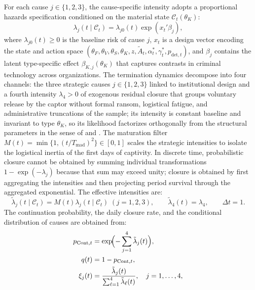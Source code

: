 \documentclass[review,authoryear,12pt]{elsarticle}
\theoremstyle{plain}
\theoremstyle{definition}
\newcommand{\1}{\mathbf{1}}
\begin{document}
For each cause $j\in\{1,2,3\}$, the cause-specific intensity adopts a proportional hazards specification conditioned on the material state $\mathcal{C}_t(\theta_K)$:
\begin{equation}
\lambda_j(t\mid\mathcal{C}_t)=\lambda_{j0}(t)\exp(x_t'\beta_j),
\label{eq:lambda-j}
\end{equation}
where $\lambda_{j0}(t)\ge 0$ is the baseline risk of cause $j$, $x_t$ is a design vector encoding the state and action space $(\theta_F,\theta_V,\theta_S,\theta_K,z,\tilde{A}_t,\alpha_t^\ast,\gamma_t^\ast,p_{\mathrm{det},t})$, and $\beta_j$ contains the latent type-specific effect $\beta_{K,j}(\theta_K)$ that captures contrasts in criminal technology across organizations. The termination dynamics decompose into four channels: the three strategic causes $j\in\{1,2,3\}$ linked to institutional design and a fourth intensity $\lambda_4>0$ of exogenous residual closure that groups voluntary release by the captor without formal ransom, logistical fatigue, and administrative truncations of the sample; its intensity is constant baseline and invariant to type $\theta_K$, so its likelihood factorizes orthogonally from the structural parameters in the sense of \citet{Lancaster1990} and \citet{AbbringVanDenBerg2003}. The maturation filter $M(t)=\min\{1,(t/T_{\mathrm{mad}})^2\}\in[0,1]$ scales the strategic intensities to isolate the logistical inertia of the first days of captivity. In discrete time, probabilistic closure cannot be obtained by summing individual transformations $1-\exp(-\lambda_j)$ because that sum may exceed unity; closure is obtained by first aggregating the intensities and then projecting period survival through the aggregated exponential. The effective intensities are:
\begin{equation}
\tilde{\lambda}_j(t\mid\mathcal{C}_t)=M(t)\lambda_j(t\mid\mathcal{C}_t)\;(j=1,2,3),\qquad\tilde{\lambda}_4(t)=\lambda_4,\qquad\Delta t=1.
\label{eq:hj}
\end{equation}
The continuation probability, the daily closure rate, and the conditional distribution of causes are obtained from:
\begin{align}
p_{\mathrm{Cont},t} &= \exp\!\Bigl(-\sum_{j=1}^{4}\tilde{\lambda}_j(t)\Bigr),\label{eq:pCont}\\
q(t) &= 1-p_{\mathrm{Cont},t},\label{eq:q}\\
\xi_j(t) &= \frac{\tilde{\lambda}_j(t)}{\sum_{\ell=1}^{4}\tilde{\lambda}_\ell(t)},\quad j=1,\ldots,4,\label{eq:xi}
\end{align}
\end{document}

